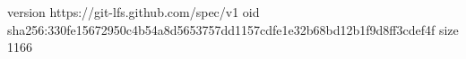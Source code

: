 version https://git-lfs.github.com/spec/v1
oid sha256:330fe15672950c4b54a8d5653757dd1157cdfe1e32b68bd12b1f9d8ff3cdef4f
size 1166
